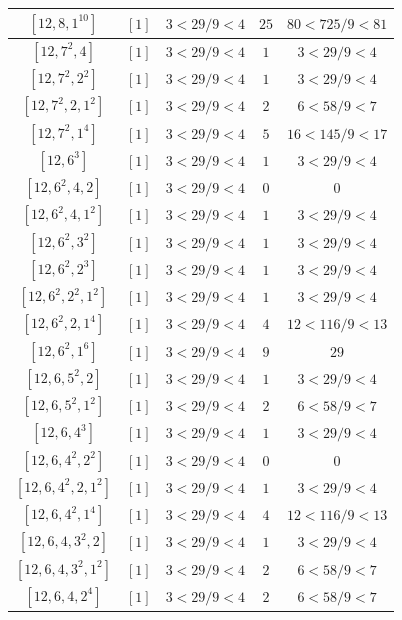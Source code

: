 \documentclass{article}%
\begin{document}
\begin{center}
\begin{longtable}{||c|c|c|c|c||}
$[12, 8, 1^{10}]$ & $[1]$ & $3 < 29/9 < 4$ & $25$ & $80 < 725/9 < 81$ \\ \hline 
$[12, 7^{2}, 4]$ & $[1]$ & $3 < 29/9 < 4$ & $1$ & $3 < 29/9 < 4$ \\ \hline 
$[12, 7^{2}, 2^{2}]$ & $[1]$ & $3 < 29/9 < 4$ & $1$ & $3 < 29/9 < 4$ \\ \hline 
$[12, 7^{2}, 2, 1^{2}]$ & $[1]$ & $3 < 29/9 < 4$ & $2$ & $6 < 58/9 < 7$ \\ \hline 
$[12, 7^{2}, 1^{4}]$ & $[1]$ & $3 < 29/9 < 4$ & $5$ & $16 < 145/9 < 17$ \\ \hline 
$[12, 6^{3}]$ & $[1]$ & $3 < 29/9 < 4$ & $1$ & $3 < 29/9 < 4$ \\ \hline 
$[12, 6^{2}, 4, 2]$ & $[1]$ & $3 < 29/9 < 4$ & $0$ & $0$ \\ \hline 
$[12, 6^{2}, 4, 1^{2}]$ & $[1]$ & $3 < 29/9 < 4$ & $1$ & $3 < 29/9 < 4$ \\ \hline 
$[12, 6^{2}, 3^{2}]$ & $[1]$ & $3 < 29/9 < 4$ & $1$ & $3 < 29/9 < 4$ \\ \hline 
$[12, 6^{2}, 2^{3}]$ & $[1]$ & $3 < 29/9 < 4$ & $1$ & $3 < 29/9 < 4$ \\ \hline 
$[12, 6^{2}, 2^{2}, 1^{2}]$ & $[1]$ & $3 < 29/9 < 4$ & $1$ & $3 < 29/9 < 4$ \\ \hline 
$[12, 6^{2}, 2, 1^{4}]$ & $[1]$ & $3 < 29/9 < 4$ & $4$ & $12 < 116/9 < 13$ \\ \hline 
$[12, 6^{2}, 1^{6}]$ & $[1]$ & $3 < 29/9 < 4$ & $9$ & $29$ \\ \hline 
$[12, 6, 5^{2}, 2]$ & $[1]$ & $3 < 29/9 < 4$ & $1$ & $3 < 29/9 < 4$ \\ \hline 
$[12, 6, 5^{2}, 1^{2}]$ & $[1]$ & $3 < 29/9 < 4$ & $2$ & $6 < 58/9 < 7$ \\ \hline 
$[12, 6, 4^{3}]$ & $[1]$ & $3 < 29/9 < 4$ & $1$ & $3 < 29/9 < 4$ \\ \hline 
$[12, 6, 4^{2}, 2^{2}]$ & $[1]$ & $3 < 29/9 < 4$ & $0$ & $0$ \\ \hline 
$[12, 6, 4^{2}, 2, 1^{2}]$ & $[1]$ & $3 < 29/9 < 4$ & $1$ & $3 < 29/9 < 4$ \\ \hline 
$[12, 6, 4^{2}, 1^{4}]$ & $[1]$ & $3 < 29/9 < 4$ & $4$ & $12 < 116/9 < 13$ \\ \hline 
$[12, 6, 4, 3^{2}, 2]$ & $[1]$ & $3 < 29/9 < 4$ & $1$ & $3 < 29/9 < 4$ \\ \hline 
$[12, 6, 4, 3^{2}, 1^{2}]$ & $[1]$ & $3 < 29/9 < 4$ & $2$ & $6 < 58/9 < 7$ \\ \hline 
$[12, 6, 4, 2^{4}]$ & $[1]$ & $3 < 29/9 < 4$ & $2$ & $6 < 58/9 < 7$ \\ \hline 

\end{longtable}
\end{center}
\end{document}
